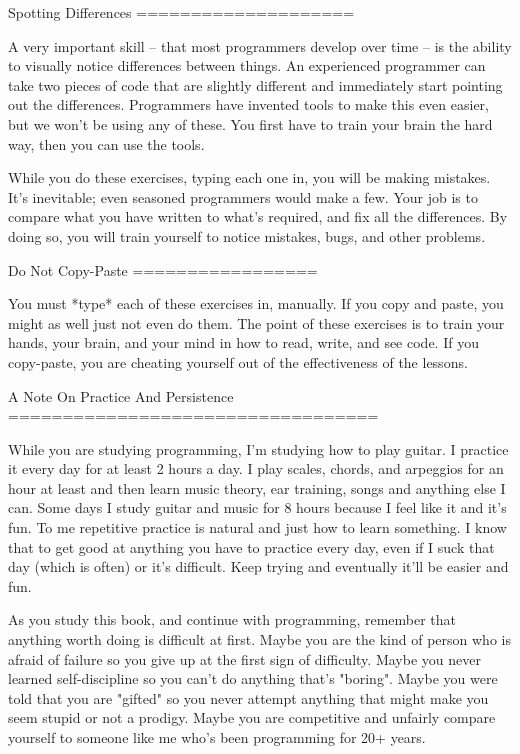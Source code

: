 Spotting Differences
====================

A very important skill -- that most programmers develop over time -- is the ability to
visually notice differences between things.  An experienced programmer can take
two pieces of code that are slightly different and immediately start pointing
out the differences.  Programmers have invented tools to make this even
easier, but we won't be using any of these.  You first have to train your
brain the hard way, then you can use the tools.

While you do these exercises, typing each one in, you will be making mistakes.
It's inevitable; even seasoned programmers would make a few.  Your
job is to compare what you have written to what's required, and fix all the
differences.  By doing so, you will train yourself to notice mistakes,
bugs, and other problems.


Do Not Copy-Paste
=================

You must *type* each of these exercises in, manually.  If you copy and paste,
you might as well just not even do them.  The point of these exercises is to
train your hands, your brain, and your mind in how to read, write, and see
code.  If you copy-paste, you are cheating yourself out of the effectiveness of
the lessons.


A Note On Practice And Persistence
==================================

While you are studying programming, I'm studying how to play guitar.  I
practice it every day for at least 2 hours a day.  I play scales, chords, and
arpeggios for an hour at least and then learn music theory, ear training, songs
and anything else I can.  Some days I study guitar and music for 8 hours because I
feel like it and it's fun.  To me repetitive practice is natural and just how
to learn something.  I know that to get good at anything you have to practice
every day, even if I suck that day (which is often) or it's difficult. Keep
trying and eventually it'll be easier and fun.

As you study this book, and continue with programming, remember that anything
worth doing is difficult at first.  Maybe you are the kind of person who is
afraid of failure so you give up at the first sign of difficulty.
Maybe you never learned self-discipline so you can't do anything that's
"boring".  Maybe you were told that you are "gifted" so you never attempt
anything that might make you seem stupid or not a prodigy.  Maybe you are
competitive and unfairly compare yourself to someone like me who's been
programming for 20+ years.


